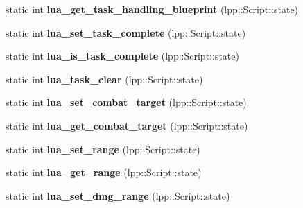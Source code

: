 \begin{DoxyCompactItemize}
\item 
static int {\bfseries lua\+\_\+get\+\_\+task\+\_\+handling\+\_\+blueprint} (lpp\+::\+Script\+::state)\hypertarget{class_lua_interface_a922cb3786dab2df027a9af69d871c0de}{}\label{class_lua_interface_a922cb3786dab2df027a9af69d871c0de}

\item 
static int {\bfseries lua\+\_\+set\+\_\+task\+\_\+complete} (lpp\+::\+Script\+::state)\hypertarget{class_lua_interface_abf0f161bea0e965b98604eb68e3f7ea2}{}\label{class_lua_interface_abf0f161bea0e965b98604eb68e3f7ea2}

\item 
static int {\bfseries lua\+\_\+is\+\_\+task\+\_\+complete} (lpp\+::\+Script\+::state)\hypertarget{class_lua_interface_acd332d00ba62ee1dd1b06ee05b929c57}{}\label{class_lua_interface_acd332d00ba62ee1dd1b06ee05b929c57}

\item 
static int {\bfseries lua\+\_\+task\+\_\+clear} (lpp\+::\+Script\+::state)\hypertarget{class_lua_interface_aebf69dd72070f53d1294b8bd54eb4b9c}{}\label{class_lua_interface_aebf69dd72070f53d1294b8bd54eb4b9c}

\item 
static int {\bfseries lua\+\_\+set\+\_\+combat\+\_\+target} (lpp\+::\+Script\+::state)\hypertarget{class_lua_interface_ae3fe0160f6897946823bfdfa7aa9b171}{}\label{class_lua_interface_ae3fe0160f6897946823bfdfa7aa9b171}

\item 
static int {\bfseries lua\+\_\+get\+\_\+combat\+\_\+target} (lpp\+::\+Script\+::state)\hypertarget{class_lua_interface_ad9ba6b4c249fd59c278f58c297fc4ba9}{}\label{class_lua_interface_ad9ba6b4c249fd59c278f58c297fc4ba9}

\item 
static int {\bfseries lua\+\_\+set\+\_\+range} (lpp\+::\+Script\+::state)\hypertarget{class_lua_interface_ae15db6cc12cd8d517955a63845986723}{}\label{class_lua_interface_ae15db6cc12cd8d517955a63845986723}

\item 
static int {\bfseries lua\+\_\+get\+\_\+range} (lpp\+::\+Script\+::state)\hypertarget{class_lua_interface_a0aeaf4fd88698fc6f2a1ad78977df00a}{}\label{class_lua_interface_a0aeaf4fd88698fc6f2a1ad78977df00a}

\item 
static int {\bfseries lua\+\_\+set\+\_\+dmg\+\_\+range} (lpp\+::\+Script\+::state)\hypertarget{class_lua_interface_aacc98cba3df44e28951e442ea848a424}{}\label{class_lua_interface_aacc98cba3df44e28951e442ea848a424}


\end{DoxyCompactItemize}
